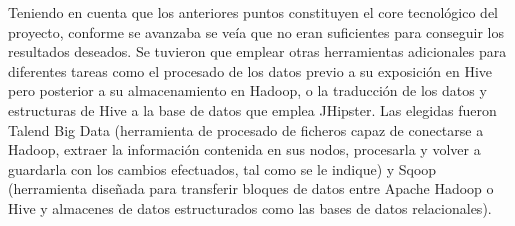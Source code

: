 Teniendo en cuenta que los anteriores puntos constituyen el core tecnológico del proyecto, conforme se avanzaba se veía que no eran suficientes para conseguir los resultados deseados. Se tuvieron que emplear otras herramientas adicionales para diferentes tareas como el procesado de los datos previo a su exposición en Hive pero posterior a su almacenamiento en Hadoop, o la traducción de los datos y estructuras de Hive a la base de datos que emplea JHipster. Las elegidas fueron Talend Big Data (herramienta de procesado de ficheros capaz de conectarse a Hadoop,  extraer la información contenida en sus nodos, procesarla y volver a guardarla con los cambios efectuados, tal como se le indique) y Sqoop (herramienta diseñada para transferir bloques de datos entre Apache Hadoop o Hive y almacenes de datos estructurados como las bases de datos relacionales). 

